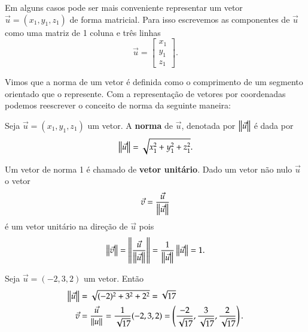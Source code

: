 Em alguns casos pode ser mais conveniente representar um vetor $\vec{u} = (x_1, y_1,z_1)$ de forma matricial. Para isso escrevemos as componentes de $\vec{u}$ como uma matriz de 1 coluna e tr\^es linhas
\[
  \vec{u} = \begin{bmatrix}
    x_1\\y_1\\z_1
  \end{bmatrix}.
\]

Vimos que a norma de um vetor \'e definida como o comprimento de um segmento orientado que o represente. Com a representa\c{c}\~ao de vetores por coordenadas podemos reescrever o conceito de norma da seguinte maneira:
\begin{definicao}
  Seja $\vec{u} = (x_1, y_1,z_1)$ um vetor. A \textbf{norma} de $\vec{u}$, denotada por $\left\Vert{\vec{u}}\right\Vert$ \'e dada por
  \[
    \left\Vert{\vec{u}}\right\Vert = \sqrt{x_1^2 + y_1^2 + z_1^2}.
  \]
\end{definicao}

Um vetor de norma 1 \'e chamado de \textbf{vetor unit\'ario}. Dado um vetor n\~ao nulo $\vec{u}$ o vetor
\[
  \vec{v} = \dfrac{\vec{u}}{\left\Vert{\vec{u}}\right\Vert}
\]
\'e um vetor unit\'ario na dire\c{c}\~ao de $\vec{u}$ pois
\[
  \left\Vert{\vec{v}}\right\Vert = \left\Vert{\dfrac{\vec{u}}{\left\Vert{\vec{u}}\right\Vert}}\right\Vert = \dfrac{1}{\left\Vert{\vec{u}}\right\Vert}\left\Vert{\vec{u}}\right\Vert = 1.
\]

\begin{exemplo}
  Seja $\vec{u} = (-2,3,2)$ um vetor. Ent\~ao
  \begin{align*}
    \left\Vert{\vec{u}}\right\Vert &= \sqrt{(-2)^2 + 3^2 + 2^2} = \sqrt{17}\\
    \vec{v} &= \dfrac{\vec{u}}{\left\Vert{u}\right\Vert} = \dfrac{1}{\sqrt{17}}(-2,3,2) = \left(\dfrac{-2}{\sqrt{17}}, \dfrac{3}{\sqrt{17}}, \dfrac{2}{\sqrt{17}}\right).
  \end{align*}
\end{exemplo}


